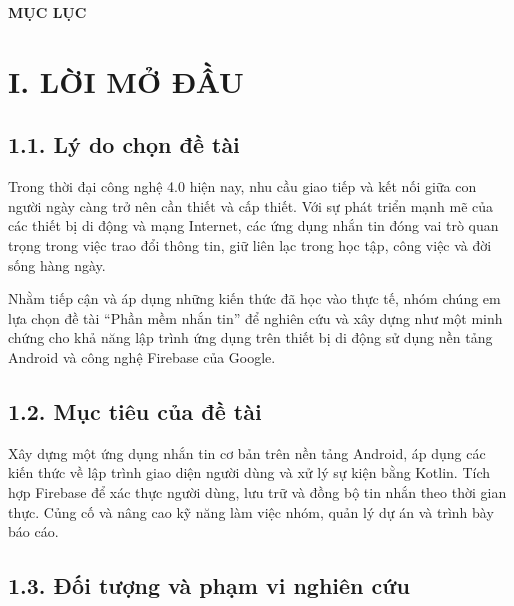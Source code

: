 \documentclass[12pt,a4paper]{article}
\begin{document}
	\begin{center}
		{\LARGE \textbf{MỤC LỤC}}
	\end{center}
	\vspace{0.2cm}
	\tableofcontents
	\clearpage
	
	\section*{I. LỜI MỞ ĐẦU}
	\vspace{0.3cm}
	
	\subsection*{1.1. Lý do chọn đề tài}
	\vspace{0.1cm}
	
	\noindent
	Trong thời đại công nghệ 4.0 hiện nay, nhu cầu giao tiếp và kết nối giữa con người ngày càng trở nên cần thiết và cấp thiết. Với sự phát triển mạnh mẽ của các thiết bị di động và mạng Internet, các ứng dụng nhắn tin đóng vai trò quan trọng trong việc trao đổi thông tin, giữ liên lạc trong học tập, công việc và đời sống hàng ngày.
	
	Nhằm tiếp cận và áp dụng những kiến thức đã học vào thực tế, nhóm chúng em lựa chọn đề tài “Phần mềm nhắn tin” để nghiên cứu và xây dựng như một minh chứng cho khả năng lập trình ứng dụng trên thiết bị di động sử dụng nền tảng Android và công nghệ Firebase của Google.
	
	\vspace{0.7cm}
	
	\subsection*{1.2. Mục tiêu của đề tài}
	\vspace{0.1cm}
	
	\noindent
	Xây dựng một ứng dụng nhắn tin cơ bản trên nền tảng Android, áp dụng các kiến thức về lập trình giao diện người dùng và xử lý sự kiện bằng Kotlin. Tích hợp Firebase để xác thực người dùng, lưu trữ và đồng bộ tin nhắn theo thời gian thực. Củng cố và nâng cao kỹ năng làm việc nhóm, quản lý dự án và trình bày báo cáo.
	
	\vspace{0.7cm}
	
	\subsection*{1.3. Đối tượng và phạm vi nghiên cứu}
	\vspace{0.1cm}
	
\end{document}
